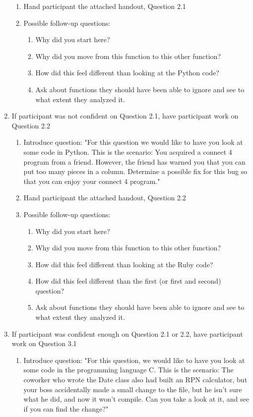 \documentclass{article}
\begin{document}
\begin{enumerate}
\begin{enumerate}
    \item Hand participant the attached handout, Question 2.1
    \item Possible follow-up questions:
     \begin{enumerate}
      \item Why did you start here?
      \item Why did you move from this function to this other function?
      \item How did this feel different than looking at the Python code?
      \item Ask about functions they should have been able to ignore and see to what extent they analyzed it.
    \end{enumerate}
  \end{enumerate}
  \item If participant was not confident on Question 2.1, have participant work on Question 2.2
   \begin{enumerate}
    \item Introduce question: "For this question we would like to have you look at some code in Python. This is the scenario: You acquired a connect 4 program from a friend. However, the friend has warned you that you can put too many pieces in a column. Determine a possible fix for this bug so that you can enjoy your connect 4 program."
    \item Hand participant the attached handout, Question 2.2
    \item Possible follow-up questions:
    \begin{enumerate}
      \item Why did you start here?
      \item Why did you move from this function to this other function?
      \item How did this feel different than looking at the Ruby code?
      \item How did this feel different than the first (or first and second) question?
      \item Ask about functions they should have been able to ignore and see to what extent they analyzed it.
    \end{enumerate}
  \end{enumerate}
  \item If participant was confident enough on Question 2.1 or 2.2, have participant work on Question 3.1
   \begin{enumerate}
    \item Introduce question: "For this question, we would like to have you look at some code in the programming language C. This is the scenario: The coworker who wrote the Date class also had built an RPN calculator, but your boss accidentally made a small change to the file, but he isn't sure what he did, and now it won't compile.  Can you take a look at it, and see if you can find the change?" 

\end{enumerate}
\end{enumerate}
\end{document}
